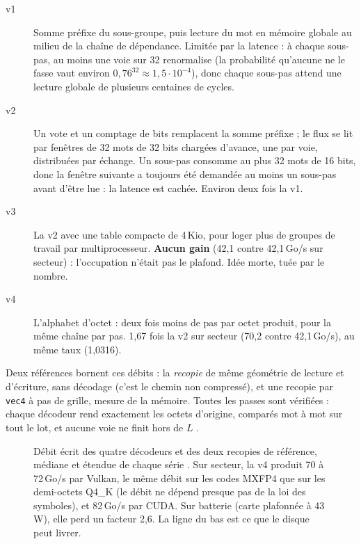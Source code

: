 \begin{description}
\item[v1] Somme préfixe du sous-groupe, puis lecture du mot en mémoire globale au milieu de la chaîne de dépendance. Limitée par la latence : à chaque sous-pas, au moins une voie sur 32 renormalise (la probabilité qu'aucune ne le fasse vaut environ $0{,}76^{32} \approx 1{,}5\cdot10^{-4}$), donc chaque sous-pas attend une lecture globale de plusieurs centaines de cycles.
\item[v2] Un vote et un comptage de bits remplacent la somme préfixe ; le flux se lit par fenêtres de 32 mots de 32 bits chargées d'avance, une par voie, distribuées par échange. Un sous-pas consomme au plus 32 mots de 16 bits, donc la fenêtre suivante a toujours été demandée au moins un sous-pas avant d'être lue : la latence est cachée. Environ deux fois la v1.
\item[v3] La v2 avec une table compacte de 4\,Kio, pour loger plus de groupes de travail par multiprocesseur. \textbf{Aucun gain} (42,1 contre 42,1\,Go/s sur secteur) : l'occupation n'était pas le plafond. Idée morte, tuée par le nombre.
\item[v4] L'alphabet d'octet : deux fois moins de pas par octet produit, pour la même chaîne par pas. 1,67 fois la v2 sur secteur (70,2 contre 42,1\,Go/s), au même taux (1,0316).
\end{description}

Deux références bornent ces débits : la \emph{recopie} de même géométrie de lecture et d'écriture, sans décodage (c'est le chemin non compressé), et une recopie par \texttt{vec4} à pas de grille, mesure de la mémoire. Toutes les passes sont vérifiées : chaque décodeur rend exactement les octets d'origine, comparés mot à mot sur tout le lot, et aucune voie ne finit hors de $L$ \mes.

\begin{figure}[ht]
\centering
\GrapheDebitsDecodeur
\caption[Débit des décodeurs rANS sur la RTX 4060 Laptop]{Débit écrit des quatre décodeurs et des deux recopies de référence, médiane et étendue de chaque série \mes. Sur secteur, la v4 produit 70 à 72\,Go/s par Vulkan, le même débit sur les codes MXFP4 que sur les demi-octets Q4\_K (le débit ne dépend presque pas de la loi des symboles), et 82\,Go/s par CUDA. Sur batterie (carte plafonnée à 43\,W), elle perd un facteur 2,6. La ligne du bas est ce que le disque peut livrer.}
\label{fig:ent-debits}
\end{figure}

